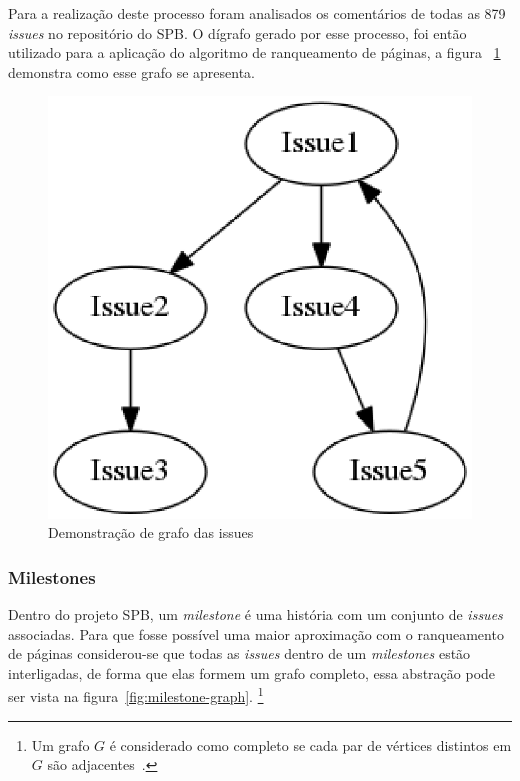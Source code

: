 Para a realização deste processo foram analisados os comentários de todas as 879
\textit{issues} no repositório do SPB. O dígrafo gerado por esse processo, foi
então utilizado para a aplicação do algoritmo de ranqueamento de páginas, a figura
~\ref{fig:issue-graph} demonstra como esse grafo se apresenta.

\begin{figure}[h]
    \centering
        \includegraphics[keepaspectratio=true,scale=0.5]{figuras/issue-graph.eps}
    \caption{Demonstração de grafo das issues}
    \label{fig:issue-graph}
\end{figure}


\subsubsection{Milestones}
\label{est:ran:mil}

Dentro do projeto SPB, um \textit{milestone} é uma história com um conjunto de 
\textit{issues} associadas. Para que fosse possível uma maior aproximação com
o ranqueamento de páginas considerou-se que todas as \textit{issues} dentro de
um \textit{milestones} estão interligadas, de forma que elas formem um grafo completo,
essa abstração pode ser vista na figura~\ref{fig:milestone-graph}.
\footnote{Um grafo $G$ é considerado como completo se cada par de vértices distintos em $G$
são adjacentes~\cite{bang}.}

